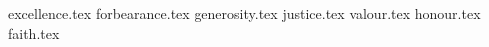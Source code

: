 
\raggedcolumns\begin{multicols}{2}

	\startsortedpricelistNSP
	
	{excellence.tex}
	{forbearance.tex}
	{generosity.tex}
	{justice.tex}
	{valour.tex}
	{honour.tex}
	{faith.tex}

	\endsortedpricelistNSP

\end{multicols}
